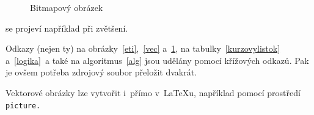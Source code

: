 \documentclass[11pt,a4paper]{article}
\begin{document}
\begin{figure}[h]
	\centering
	\caption{Bitmapový obrázek}
	\label{bitmap}
\end{figure}
\bigskip
\noindent se projeví například při zvětšení.

Odkazy (nejen ty) na obrázky~\ref{eti},~\ref{vec} a~\ref{bitmap}, na
tabulky~\ref{kurzovylistok} a~\ref{logika}~a také na algoritmus~\ref{alg} jsou
udělány pomocí křížových odkazů. Pak je ovšem potřeba zdrojový soubor přeložit dvakrát.
	
	Vektorové obrázky lze vytvořit i~přímo v~{\LaTeX}u, například pomocí prostředí\texttt{ picture.}
	
\end{document}
